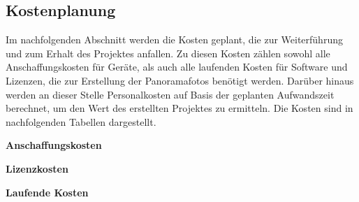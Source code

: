 \subsection{Kostenplanung}
\label{sec:Kostenplanung}

Im nachfolgenden Abschnitt werden die Kosten geplant, die zur Weiterführung und
zum Erhalt des Projektes anfallen. Zu diesen Kosten zählen sowohl alle
Anschaffungskosten für Geräte, als auch alle laufenden Kosten für
Software und Lizenzen, die zur Erstellung der Panoramafotos benötigt werden.
Darüber hinaus werden an dieser Stelle Personalkosten auf Basis der geplanten
Aufwandszeit berechnet, um den Wert des erstellten Projektes zu
ermitteln.
Die Kosten sind in nachfolgenden Tabellen dargestellt. 

\textbf{Anschaffungskosten}



\textbf{Lizenzkosten}



\clearpage
\textbf{Laufende Kosten}



